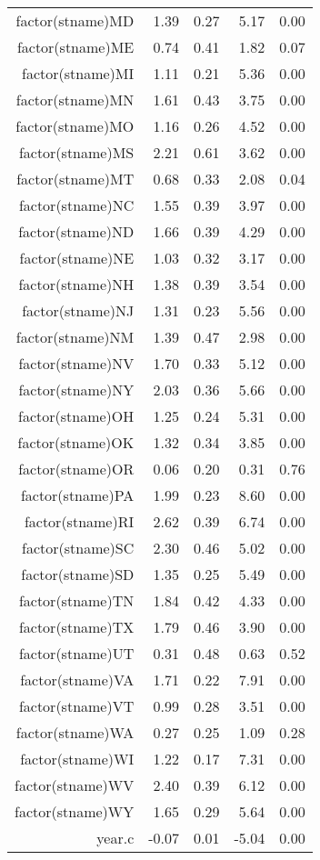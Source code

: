 \begin{table}[ht]
\begin{tabular}{rrrrr}
  factor(stname)MD & 1.39 & 0.27 & 5.17 & 0.00 \\ 
  factor(stname)ME & 0.74 & 0.41 & 1.82 & 0.07 \\ 
  factor(stname)MI & 1.11 & 0.21 & 5.36 & 0.00 \\ 
  factor(stname)MN & 1.61 & 0.43 & 3.75 & 0.00 \\ 
  factor(stname)MO & 1.16 & 0.26 & 4.52 & 0.00 \\ 
  factor(stname)MS & 2.21 & 0.61 & 3.62 & 0.00 \\ 
  factor(stname)MT & 0.68 & 0.33 & 2.08 & 0.04 \\ 
  factor(stname)NC & 1.55 & 0.39 & 3.97 & 0.00 \\ 
  factor(stname)ND & 1.66 & 0.39 & 4.29 & 0.00 \\ 
  factor(stname)NE & 1.03 & 0.32 & 3.17 & 0.00 \\ 
  factor(stname)NH & 1.38 & 0.39 & 3.54 & 0.00 \\ 
  factor(stname)NJ & 1.31 & 0.23 & 5.56 & 0.00 \\ 
  factor(stname)NM & 1.39 & 0.47 & 2.98 & 0.00 \\ 
  factor(stname)NV & 1.70 & 0.33 & 5.12 & 0.00 \\ 
  factor(stname)NY & 2.03 & 0.36 & 5.66 & 0.00 \\ 
  factor(stname)OH & 1.25 & 0.24 & 5.31 & 0.00 \\ 
  factor(stname)OK & 1.32 & 0.34 & 3.85 & 0.00 \\ 
  factor(stname)OR & 0.06 & 0.20 & 0.31 & 0.76 \\ 
  factor(stname)PA & 1.99 & 0.23 & 8.60 & 0.00 \\ 
  factor(stname)RI & 2.62 & 0.39 & 6.74 & 0.00 \\ 
  factor(stname)SC & 2.30 & 0.46 & 5.02 & 0.00 \\ 
  factor(stname)SD & 1.35 & 0.25 & 5.49 & 0.00 \\ 
  factor(stname)TN & 1.84 & 0.42 & 4.33 & 0.00 \\ 
  factor(stname)TX & 1.79 & 0.46 & 3.90 & 0.00 \\ 
  factor(stname)UT & 0.31 & 0.48 & 0.63 & 0.52 \\ 
  factor(stname)VA & 1.71 & 0.22 & 7.91 & 0.00 \\ 
  factor(stname)VT & 0.99 & 0.28 & 3.51 & 0.00 \\ 
  factor(stname)WA & 0.27 & 0.25 & 1.09 & 0.28 \\ 
  factor(stname)WI & 1.22 & 0.17 & 7.31 & 0.00 \\ 
  factor(stname)WV & 2.40 & 0.39 & 6.12 & 0.00 \\ 
  factor(stname)WY & 1.65 & 0.29 & 5.64 & 0.00 \\ 
  year.c & -0.07 & 0.01 & -5.04 & 0.00 \\ 
   \hline
\end{tabular}
\end{table}
